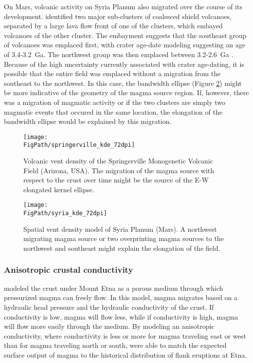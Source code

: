 On Mars, volcanic activity on Syria Planum also migrated over the course of its development. \citet{richardson2013volcanic} identified two major sub-clusters of coalesced shield volcanoes, separated by a large lava flow front of one of the clusters, which embayed volcanoes of the other cluster. The embayment suggests that the southeast group of volcanoes was emplaced first, with crater age-date modeling suggesting an age of 3.4-3.2~Ga. The northwest group was then emplaced between 3.2-2.6~Ga \citep{richardson2013volcanic}. Because of the high uncertainty currently associated with crater age-dating, it is possible that the entire field was emplaced without a migration from the southeast to the northwest. In this case, the bandwidth ellipse (Figure \ref{fig_syriakde}) might be more indicative of the geometry of the magma source region. If, however, there was a migration of magmatic activity or if the two clusters are simply two magmatic events that occured in the same location, the elongation of the bandwidth ellipse would be explained by this migration.

\begin{figure}
\centering
\texttt{[image: \\FigPath/springerville\_kde\_72dpi]}
\caption[Volcanic vent density of the Springerville Monogenetic Volcanic Field (Arizona, USA)]{Volcanic vent density of the Springerville Monogenetic Volcanic Field (Arizona, USA). The migration of the magma source with respect to the crust over time might be the source of the E-W elongated kernel ellipse.}
\label{fig_springervillekde}
\end{figure}

\begin{figure}
\centering
\texttt{[image: \\FigPath/syria\_kde\_72dpi]}
\caption[Spatial vent density model of Syria Planum (Mars)]{Spatial vent density model of Syria Planum (Mars). A northwest migrating magma source or two overprinting magma sources to the northwest and southeast might explain the elongation of the field.}
\label{fig_syriakde}
\end{figure}


\subsubsection{Anisotropic crustal conductivity}
\citet{bonafede1998porous} modeled the crust under Mount Etna as a porous medium through which pressurized magma can freely flow. In this model, magma migrates based on a hydraulic head pressure and the hydraulic conductivity of the crust. If conductivity is low, magma will flow less, while if conductivity is high, magma will flow more easily through the medium. By modeling an anisotropic conductivity, where conductivity is less or more for magma traveling east or west than for magma traveling north or south, \citet{bonafede1998porous} were able to match the expected surface output of magma to the historical distribution of flank eruptions at Etna. 

